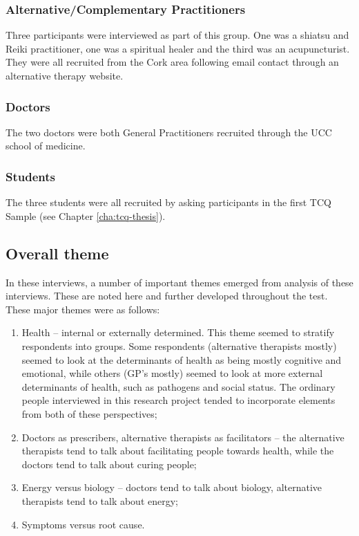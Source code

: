 \subsubsection{Alternative/Complementary Practitioners}



Three participants were interviewed as part of this group. One was a shiatsu and Reiki practitioner, one was a spiritual healer and the third was an acupuncturist. They were all recruited from the Cork area following email contact through an alternative therapy website. 

\subsubsection{Doctors}
\label{sec:doctors}

The two doctors were both General Practitioners recruited through the UCC school of medicine. 

\subsubsection{Students}
\label{sec:students}

The three students were all recruited by asking participants in the first TCQ Sample (see Chapter \ref{cha:tcq-thesis}). 



\subsection{Overall theme}

In these interviews, a number of important themes emerged from analysis of these interviews. These are noted here and further developed throughout the test. These major themes were as follows:
\begin{enumerate}
\item Health – internal or externally determined. This theme seemed to stratify respondents into groups. Some respondents (alternative therapists mostly) seemed to look at the determinants of health as being mostly cognitive and emotional, while others (GP's mostly) seemed to look at more external determinants of health, such as pathogens and social status. The ordinary people interviewed in this research project tended to incorporate elements from both of these perspectives;
\item Doctors as prescribers, alternative therapists as facilitators – the alternative therapists tend to talk about facilitating people towards health, while the doctors tend to talk about curing people;
\item Energy versus biology – doctors tend to talk about biology, alternative therapists tend to talk about energy;
\item Symptoms versus root cause.

\end{enumerate}




